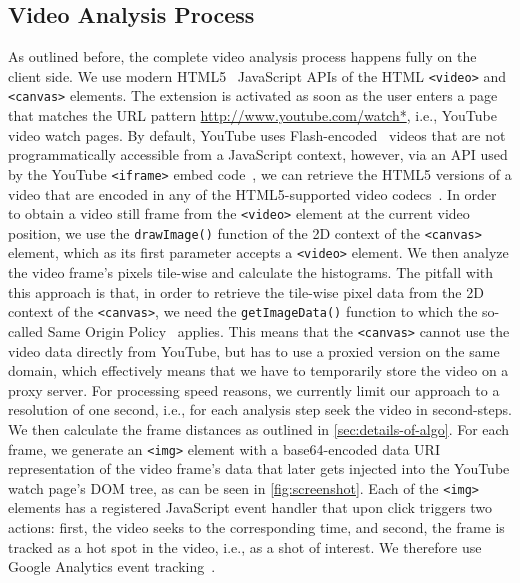 \documentclass{acm_proc_article-sp}
\newcommand{\inlinelistingsize}{\fontsize{8pt}{11pt}}
\let\oldurl\url
\renewcommand{\url}[1]{\inlinelistingsize\oldurl{#1}}
\begin{document}
\subsection{Video Analysis Process}
As outlined before, the complete video analysis process happens fully on the client side. We use modern HTML5~\cite{w3c_html5} JavaScript APIs of the HTML \texttt{<video>} and \texttt{<canvas>} elements. The extension is activated as soon as the user enters a page that matches the URL pattern \url{http://www.youtube.com/watch*}, i.e., YouTube video watch pages. By default, YouTube uses Flash-encoded~\cite{flash} videos that are not programmatically accessible from a JavaScript context, however, via an API used by the YouTube \texttt{<iframe>} embed code~\cite{youtubeiframe}, we can retrieve the HTML5 versions of a video that are encoded in any of the HTML5-supported video codecs~\cite{html5video}. In order to obtain a video still frame from the \texttt{<video>} element at the current video position, we use the \texttt{drawImage()} function of the 2D context of the \texttt{<canvas>} element, which as its first parameter accepts a \texttt{<video>} element. We then analyze the video frame's pixels tile-wise and calculate the histograms. The pitfall with this approach is that, in order to retrieve the tile-wise pixel data from the 2D context of the \texttt{<canvas>}, we need the \texttt{getImageData()} function to which the so-called Same Origin Policy~\cite{sameoriginpolicy} applies. This means that the \texttt{<canvas>} cannot use the video data directly  from YouTube, but has to use a proxied version on the same domain, which effectively means that we have to temporarily store the video on a proxy server. For processing speed reasons, we currently limit our approach to a resolution of one second, i.e., for each analysis step seek the video in second-steps. We then calculate the frame distances as outlined in \autoref{sec:details-of-algo}. For each frame, we generate an \texttt{<img>} element with a base64-encoded data URI~\cite{datauri} representation of the video frame's data that later gets injected into the YouTube watch page's DOM tree, as can be seen in \autoref{fig:screenshot}. Each of the \texttt{<img>} elements has a registered JavaScript event handler that upon click triggers two actions: first, the video seeks to the corresponding time, and second, the frame is tracked as a hot spot in the video, i.e., as a shot of interest. We therefore use Google Analytics event tracking~\cite{analyticsevent}.
\end{document}
